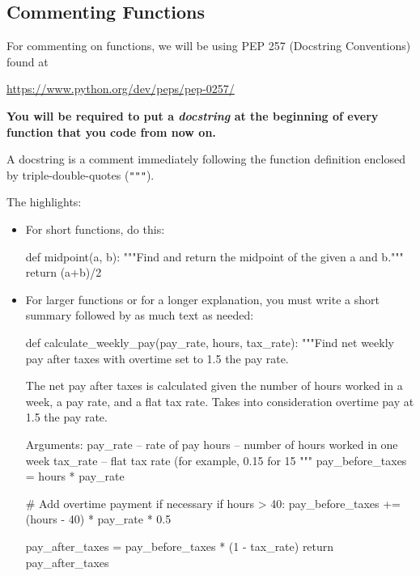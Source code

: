 \documentclass[11pt]{cselabheader}
\begin{document}
\pagebreak
\subsection{Commenting Functions}

For commenting on functions, we will be using PEP 257 (Docstring Conventions)
found at
\begin{center}
  \url{https://www.python.org/dev/peps/pep-0257/}
\end{center}

\begin{center}
\bfseries \large You will be required to put a \emph{docstring} at the beginning
of every function that you code from now on.
\end{center}
A docstring is a comment immediately
following the function definition enclosed by triple-double-quotes (\texttt{"""}).

The highlights:
\begin{itemize}
  \item For short functions, do this:

    \begin{python3code}
def midpoint(a, b):
    """Find and return the midpoint of the given a and b."""
    return (a+b)/2
    \end{python3code}

  \item For larger functions or for a longer explanation, you must write a
      short summary followed by as much text as needed:

    \begin{python3code}
def calculate_weekly_pay(pay_rate, hours, tax_rate):
    """Find net weekly pay after taxes with overtime set to 1.5 the pay rate.

    The net pay after taxes is calculated given the number of hours worked in a
    week, a pay rate, and a flat tax rate. Takes into consideration overtime pay
    at 1.5 the pay rate.

    Arguments:
    pay_rate -- rate of pay
    hours -- number of hours worked in one week
    tax_rate -- flat tax rate (for example, 0.15 for 15%
    """
    pay_before_taxes = hours * pay_rate

    # Add overtime payment if necessary
    if hours > 40:
        pay_before_taxes += (hours - 40) * pay_rate * 0.5

    pay_after_taxes = pay_before_taxes * (1 - tax_rate)
    return pay_after_taxes
    \end{python3code}
\end{itemize}
\end{document}

